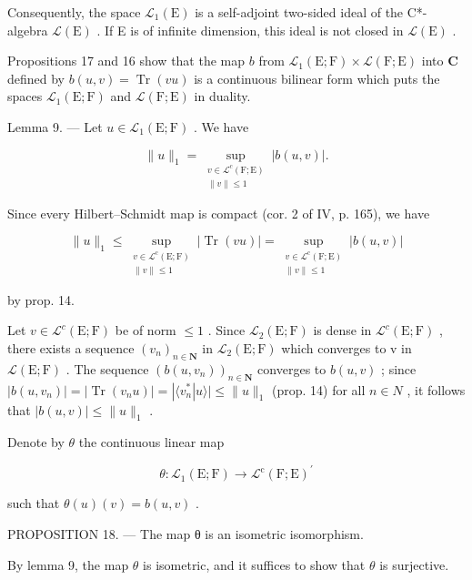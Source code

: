 Consequently, the space \(\mathcal{L}_{1}(\mathrm{E})\) is a self-adjoint two-sided ideal of the C*-algebra \(\mathcal{L}(\mathrm{E})\) . If E is of infinite dimension, this ideal is not closed in \(\mathcal{L}(\mathrm{E})\) .

Propositions 17 and 16 show that the map \(b\) from \(\mathcal{L}_1(\mathrm{E};\mathrm{F})\times \mathcal{L}(\mathrm{F};\mathrm{E})\) into \(\mathbf{C}\) defined by \(b(u,v) = \operatorname {Tr}(vu)\) is a continuous bilinear form which puts the spaces \(\mathcal{L}_1(\mathrm{E};\mathrm{F})\) and \(\mathcal{L}(\mathrm{F};\mathrm{E})\) in duality.

Lemma 9. --- Let \(u \in \mathcal{L}_1(\mathrm{E};\mathrm{F})\) . We have

\[
\| u\|_{1} = \sup_{\substack{v\in \mathcal{L}^{c}(\mathrm{F};\mathrm{E})\\ \| v\| \leqslant 1}}|b(u,v)|.
\]

Since every Hilbert--Schmidt map is compact (cor. 2 of IV, p. 165), we have

\[
\| u\|_{1}\leqslant \sup_{\substack{v\in \mathcal{L}^{\mathrm{c}}(\mathrm{E};\mathrm{F})\\ \| v\| \leqslant 1}}|\operatorname{Tr}(vu)| = \sup_{\substack{v\in \mathcal{L}^{\mathrm{c}}(\mathrm{F};\mathrm{E})\\ \| v\| \leqslant 1}}|b(u,v)|
\]

by prop. 14.

Let \(v \in \mathcal{L}^{c}(\mathrm{E};\mathrm{F})\) be of norm \(\leqslant 1\) . Since \(\mathcal{L}_{2}(\mathrm{E};\mathrm{F})\) is dense in \(\mathcal{L}^{c}(\mathrm{E};\mathrm{F})\) , there exists a sequence \((v_{n})_{n\in\mathbf{N}}\) in \(\mathcal{L}_{2}(\mathrm{E};\mathrm{F})\) which converges to v in \(\mathcal{L}(\mathrm{E};\mathrm{F})\) . The sequence \((b(u,v_{n}))_{n\in\mathbf{N}}\) converges to \(b(u,v)\) ; since \(|b(u,v_{n})| = |\operatorname{Tr}(v_{n}u)| = |\langle v_{n}^{*}|u\rangle| \leqslant \|u\|_{1}\) (prop. 14) for all \(n \in N\) , it follows that \(|b(u,v)| \leqslant \|u\|_{1}\) .

Denote by \(\theta\) the continuous linear map

\[
\theta \colon \mathcal {L} _ {1} (\mathrm{E}; \mathrm{F}) \to \mathcal {L} ^ {\mathrm{c}} (\mathrm{F}; \mathrm{E}) ^ {\prime}
\]

such that \(\theta(u)(v) = b(u,v)\) .

PROPOSITION 18. --- The map θ is an isometric isomorphism.

By lemma 9, the map \(\theta\) is isometric, and it suffices to show that \(\theta\) is surjective.

